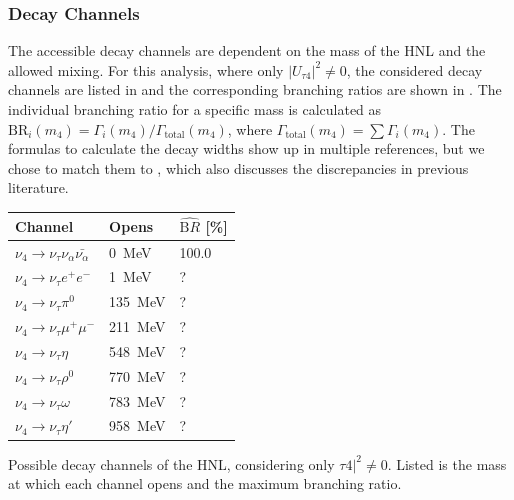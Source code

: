 \subsubsection{Decay Channels} 

The accessible decay channels are dependent on the mass of the HNL and the allowed mixing. For this analysis, where only $|U_{\tau4}|^2 \neq 0$, the considered decay channels are listed in  and the corresponding branching ratios are shown in . The individual branching ratio for a specific mass is calculated as $\mathrm{BR}_i(m_4)=\Gamma_i(m_4)/\Gamma_\mathrm{total}(m_4)$, where $\Gamma_\mathrm{total}(m_4)=\sum\Gamma_i(m_4)$. The formulas to calculate the decay widths show up in multiple references, but we chose to match them to , which also discusses the discrepancies in previous literature.

\begin{margintable}
    \footnotesize
    \begin{tabular} { lll }
        \hline\hline 
        \textbf{Channel} & \textbf{Opens} & \textbf{$\hat{\mathrm BR}$ [\%]} \\
        \hline\hline 
        $\nu_4 \rightarrow \nu_\tau \nu_\alpha \bar{\nu_\alpha}$ & \SI{0}{\MeV} & 100.0 \\
        $\nu_4 \rightarrow \nu_\tau e^+ e^-$ & \SI{1}{\MeV} & ? \\
        $\nu_4 \rightarrow \nu_\tau \pi^0$ & \SI{135}{\MeV} & ? \\
        $\nu_4 \rightarrow \nu_\tau \mu^+ \mu^-$ & \SI{211}{\MeV} & ? \\
        $\nu_4 \rightarrow \nu_\tau \eta$ & \SI{548}{\MeV} & ? \\
        $\nu_4 \rightarrow \nu_\tau \rho^0$ & \SI{770}{\MeV} & ? \\
        $\nu_4 \rightarrow \nu_\tau \omega$ & \SI{783}{\MeV} & ? \\
        $\nu_4 \rightarrow \nu_\tau \eta'$ & \SI{958}{\MeV} & ? \\
        \hline
    \end{tabular}
    \caption[HNL mass dependent decay channels]{Possible decay channels of the HNL, considering only ${\tau4}|^2 \neq 0$. Listed is the mass at which each channel opens and the maximum branching ratio.}
\end{margintable}


